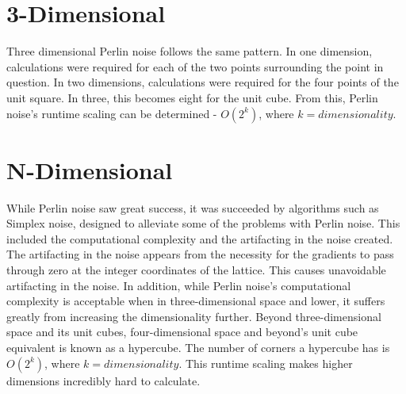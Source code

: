 \documentclass[10pt]{report}
\begin{document}
		\section{3-Dimensional}
		
		Three dimensional Perlin noise follows the same pattern. In one dimension, calculations were required for each of the two points surrounding the point in question. In two dimensions, calculations were required for the four points of the unit square. In three, this becomes eight for the unit cube. From this, Perlin noise's runtime scaling can be determined - \(O(2^k)\), where \(k = dimensionality\). 
		
		\section{N-Dimensional}
		
		While Perlin noise saw great success, it was succeeded by algorithms such as Simplex noise, designed to alleviate some of the problems with Perlin noise. This included the computational complexity and the artifacting in the noise created. The artifacting in the noise appears from the necessity for the gradients to pass through zero at the integer coordinates of the lattice. This causes unavoidable artifacting in the noise. In addition, while Perlin noise's computational complexity is acceptable when in three-dimensional space and lower, it suffers greatly from increasing the dimensionality further. Beyond three-dimensional space and its unit cubes, four-dimensional space and beyond's unit cube equivalent is known as a hypercube. The number of corners a hypercube has is \(O(2^k)\), where \(k = dimensionality\). This runtime scaling makes higher dimensions incredibly hard to calculate. 
		
\end{document}
